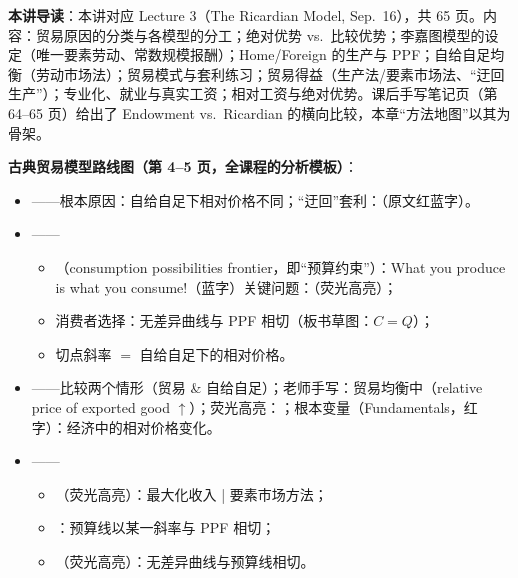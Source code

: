 
\textbf{本讲导读}：本讲对应 Lecture 3（The Ricardian Model, Sep.\ 16），共 65 页。内容：贸易原因的分类与各模型的分工；绝对优势 vs.\ 比较优势；李嘉图模型的设定（唯一要素劳动、常数规模报酬）；Home/Foreign 的生产与 PPF；自给自足均衡（劳动市场法）；贸易模式与套利练习；贸易得益（生产法/要素市场法、``迂回生产''）；专业化、就业与真实工资；相对工资与绝对优势。课后手写笔记页（第 64--65 页）给出了 Endowment vs.\ Ricardian 的横向比较，本章``方法地图''以其为骨架。


\textbf{古典贸易模型路线图（第 4--5 页，全课程的分析模板）}：
\begin{itemize}
  \item {}——根本原因：自给自足下相对价格不同；``迂回''套利：（原文红蓝字）。
  \item {}——
    \begin{itemize}
      \item {}（consumption possibilities frontier，即``预算约束''）：What you produce is what you consume!（蓝字）关键问题：（荧光高亮）；
      \item 消费者选择：无差异曲线与 PPF 相切（板书草图：$C = Q$）；
      \item 切点斜率 $=$ 自给自足下的相对价格。
    \end{itemize}
  \item {}——比较两个情形（贸易 \& 自给自足）；老师手写：贸易均衡中（relative price of exported good $\uparrow$）；荧光高亮：；根本变量（Fundamentals，红字）：经济中的相对价格变化。
  \item {}——
    \begin{itemize}
      \item {}（荧光高亮）：最大化收入 | 要素市场方法；
      \item {}：预算线以某一斜率与 PPF 相切；
      \item {}（荧光高亮）：无差异曲线与预算线相切。
    \end{itemize}
\end{itemize}

